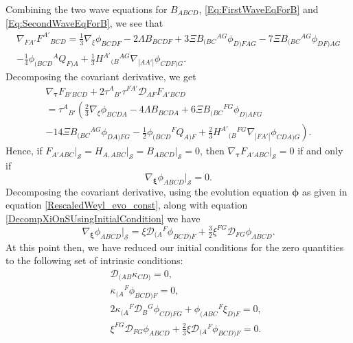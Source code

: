 \documentclass[10pt,a4paper]{article}
\theoremstyle{plain}
\begin{document}
\medskip
Combining the two wave equations for $B_{ABCD}$,
\eqref{Eq:FirstWaveEqForB} and \eqref{Eq:SecondWaveEqForB}, we see
that
\begin{multline}
     \nabla_{FA'}F^{A'}{}_{BCD} = \tfrac{1}{3}
     \nabla_{\xi}{}\phi_{BCDF} - 2 \Lambda B_{BCDF} + 3\Xi
     B_{(BC}{}^{AG} \phi_{D)FAG} - 7 \Xi B_{(BC}{}^{AG}\phi_{DF)AG}
     \\- \tfrac{1}{4} \phi_{(BCD}{}^{A}Q_{F)A} + \tfrac{1}{3}
     H^{A'}{}_{(B}{}^{AG}\nabla_{|AA'|}\phi_{CDF)G}\label{CurlOfFInTermsOfCollineation}.
\end{multline}
Decomposing the covariant derivative, we get
\begin{multline}
\nabla_{\bm\tau} F_{B'BCD} + 2 \tau^{A}{}_{B'} \tau^{FA'}
\mathcal{D}_{AF}F_{A'BCD} \\ = \tau^{A}{}_{B'}\left(\tfrac{2}{3}
\nabla_{\xi}{}\phi_{BCDA} - 4 \Lambda B_{BCDA} + 6 \Xi B_{(BC}{}^{FG}
\phi_{D)AFG} \right. \\ \left.  - 14 \Xi B_{(BC}{}^{AG}\phi_{DA)FG} -
\tfrac{1}{2} \phi_{(BCD}{}^{F}Q_{A)F} + \tfrac{2}{3}
H^{A'}{}_{(B}{}^{FG}\nabla_{|FA'|}\phi_{CDA)G}\right).
\end{multline}
Hence, if
$F_{A'ABC}\big\vert_{\mathcal{S}}=H_{A,ABC}\big\vert_{\mathcal{S}}=B_{ABCD}\big\vert_{\mathcal{S}}=0$,
then $\nabla_{\bm\tau}F_{A'ABC}\big\vert_{\mathcal{S}}=0$ if and only
if
\[ \nabla_{\bm\xi}\phi_{ABCD}\big\vert_{\mathcal{S}}=0.\]
Decomposing the covariant derivative, using the evolution equation $\bm\phi$
as given in equation \eqref{RescaledWeyl_evo_const}, along with equation
\eqref{DecompXiOnSUsingInitialCondition} we have
\[ \nabla_{\bm\xi}\phi_{ABCD}\big\vert_{\mathcal{S}} =  \xi \mathcal{D}_{(A}{}^{F}\phi_{BCD)F} + \tfrac{3}{2} \xi^{FG} \mathcal{D}_{FG}\phi_{ABCD}. \]
At this point then, we have reduced our initial conditions for the
zero quantities to the following set of intrinsic conditions:
\begin{subequations}
\begin{eqnarray}
    && \mathcal{D}_{(AB}\kappa_{CD)}=0,\\ &&
  \kappa_{(A}{}^F\phi_{BCD)F}=0,\\ && 2
  \kappa_{(A}{}^{F}\mathcal{D}_{B}{}^{G}\phi_{CD)FG} +
  \phi_{(ABC}{}^{F}\xi_{D)F} = 0,\label{RedundantCondition1}\\ &&
  \xi^{FG}\mathcal{D}_{FG}\phi_{ABCD} +
  \tfrac{2}{3}\xi\mathcal{D}_{(A}{}^F\phi_{BCD)F} =
  0. \label{RedundantCondition2}
\end{eqnarray}
\end{subequations}
\end{document}
